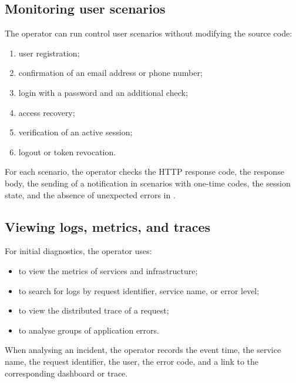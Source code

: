\documentclass[12pt,a4paper]{extarticle}
\begin{document}
\subsection{Monitoring user scenarios}

\begin{hseExample}
The operator can run control user scenarios without modifying the source code:

\begin{enumerate}[label=\arabic*), leftmargin=1.25cm]
    \item user registration;
    \item confirmation of an email address or phone number;
    \item login with a password and an additional check;
    \item access recovery;
    \item verification of an active session;
    \item logout or token revocation.
\end{enumerate}

For each scenario, the operator checks the HTTP response code, the response body, the sending of a notification in scenarios with one-time codes, the session state, and the absence of unexpected errors in .
\end{hseExample}

\subsection{Viewing logs, metrics, and traces}

\begin{hseExample}
For initial diagnostics, the operator uses:

\begin{itemize}[leftmargin=1.25cm]
    \item {} to view the metrics of services and infrastructure;
    \item {} to search for logs by request identifier, service name, or error level;
    \item {} to view the distributed trace of a request;
    \item {} to analyse groups of application errors.
\end{itemize}

When analysing an incident, the operator records the event time, the service name, the request identifier, the user, the error code, and a link to the corresponding dashboard or trace.
\end{hseExample}
\end{document}
